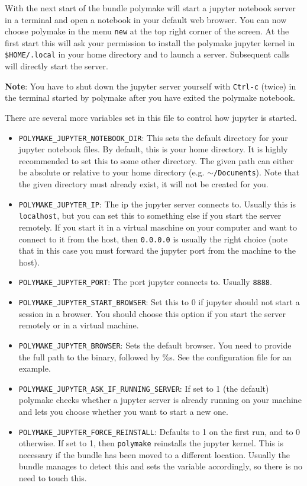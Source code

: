 \documentclass[a4paper]{amsart}
\newcommand{\polymake}{\texttt{polymake}\xspace}
\begin{document}
With the next start of the bundle polymake will start a jupyter notebook server in a terminal and open a notebook in your default web browser. You can now choose polymake in the menu \texttt{new} at the top right corner of the screen. At the first start this will ask your permission to install the polymake jupyter kernel in \texttt{\$HOME/.local} in your home directory and to launch a server. Subsequent calls will directly start the server. 

\textbf{Note}: You have to shut down the jupyter server yourself with \texttt{Ctrl-c} (twice) in the terminal started by polymake after you have exited the polymake notebook. 

There are several more variables set in this file to control how jupyter is started.
\begin{itemize}
\item \texttt{POLYMAKE\_JUPYTER\_NOTEBOOK\_DIR}: This sets the default directory for your jupyter notebook files. By default, this is your home directory. It is highly recommended to set this to some other directory. The given path can either be absolute or relative to your home directory (e.g. \texttt{$\sim$/Documents}). Note that the given directory must already exist, it will not be created for you.
\item \texttt{POLYMAKE\_JUPYTER\_IP}: The ip the jupyter server connects to. Usually this is \texttt{localhost}, but you can set this to something else if you start the server remotely. If you start it in a virtual maschine on your computer and want to connect to it from the host, then \texttt{0.0.0.0} is usually the right choice (note that in this case you must forward the jupyter port from the machine to the host).
\item \texttt{POLYMAKE\_JUPYTER\_PORT}: The port jupyter connects to. Usually \texttt{8888}.
\item \texttt{POLYMAKE\_JUPYTER\_START\_BROWSER}: Set this to 0 if jupyter should not start a session in a browser. You should choose this option if you start the server remotely or in a virtual machine. 
\item \texttt{POLYMAKE\_JUPYTER\_BROWSER}: Sets the default browser. You need to provide the full path to the binary, followed by \%s. See the configuration file for an example.
\item \texttt{POLYMAKE\_JUPYTER\_ASK\_IF\_RUNNING\_SERVER}: If set to 1 (the default) polymake checks whether a jupyter server is already running on your machine and lets you choose whether you want to start a new one.
\item \texttt{POLYMAKE\_JUPYTER\_FORCE\_REINSTALL}: Defaults to 1 on the first run, and to 0 otherwise. If set to 1, then \polymake reinstalls the jupyter kernel. This is necessary if the bundle has been moved to a different location. Usually the bundle manages to detect this and sets the variable accordingly, so there is no need to touch this.
\end{itemize}
\end{document}
